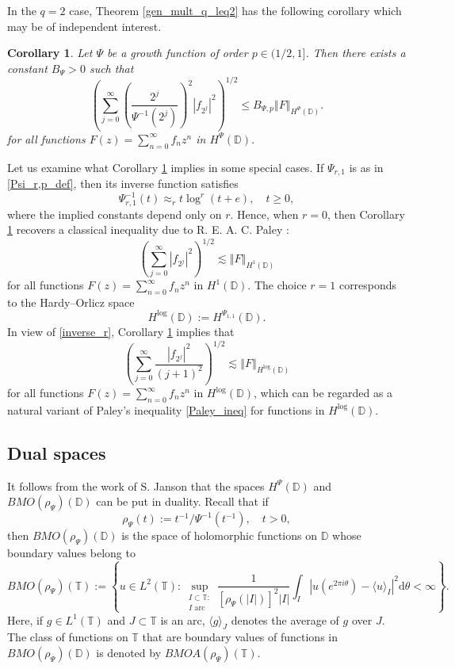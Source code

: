 \documentclass[a4paper, leqno, 10pt]{amsart}
\numberwithin{equation}{section}
\newtheorem{corollary}[thm]{Corollary}
\newcommand{\dd}{\mathrm{d}}
\newcommand{\T}{\mathbb{T}}
\newcommand{\norm}[1]{\left\Vert#1\right\Vert}
\newcommand{\abs}[1]{\left|#1\right|}
\newcommand{\D}{\mathbb{D}}
\begin{document}
In the $q=2$ case, Theorem \ref{gen_mult_q_leq2} has the following corollary which may be of independent interest.

\begin{corollary}\label{cor_Paley_ineq_Psi}
Let $\Psi$  be a growth function of order $p \in (1/2,1]$. 
Then there exists a constant $B_{\Psi} >0$ such that
\[
\left( \sum_{j = 0}^{\infty} \left( \frac {2^j} {\Psi^{-1}(2^j)} \right)^2 |f_{2^j}|^2 \right)^{1/2} \leq B_{\Psi, p} \norm{ F }_{H^{\Psi} (\D)}.
\]
for all functions $F(z)=\sum_{n=0}^{\infty} f_n z^n$ in $H^{\Psi} (\D)$.
\end{corollary}

Let us examine what Corollary \ref{cor_Paley_ineq_Psi} implies in some special cases. If  $\Psi_{r,1} $ is as in \eqref{Psi_r,p_def}, then its inverse function satisfies
\begin{equation}\label{inverse_r}
\Psi^{-1}_{r,1} (t) \approx_r  t \log^r (t+e), \quad t \geq 0,
\end{equation}
where the implied constants depend only on $r$. Hence, when $r=0$, then Corollary \ref{cor_Paley_ineq_Psi} recovers a classical inequality due to R. E. A. C. Paley \cite{P}:
\begin{equation}\label{Paley_ineq}
\left( \sum_{j = 0}^{\infty} |f_{2^j}|^2 \right)^{1/2} \lesssim \norm{ F }_{H^1 (\D)} 
\end{equation}
for all functions $F(z)=\sum_{n=0}^{\infty} f_n z^n$ in $H^1 (\D)$. The choice $r=1$ corresponds to the Hardy--Orlicz space
\[
H^{\log} (\D) := H^{\Psi_{1,1}} (\D) .\]
In view of \eqref{inverse_r}, Corollary \ref{cor_Paley_ineq_Psi} implies that
\begin{equation}\label{Paley_ineq_Hlog}
\left(\sum_{j = 0}^{\infty} \frac{|f_{2^j}|^2}{(j+1)^{2}} \right)^{1/2} \lesssim \norm{ F }_{H^{\log} (\D)}  
\end{equation}
for all functions $F(z)=\sum_{n=0}^{\infty} f_n z^n$ in $H^{\log}(\D)$, which can be regarded as a natural variant of Paley's inequality \eqref{Paley_ineq} for functions in $H^{\log} (\D)$.

\subsection*{Dual spaces}
It follows from the work of S. Janson \cite{J} that the spaces $H^{\Psi} (\D)$ and $BMO(\rho_{\Psi})(\D)$ can be put in duality. Recall that if \[\rho_{\Psi} (t):=t^{-1} /\Psi^{-1} (t^{-1}), \quad t > 0,\] then $BMO(\rho_{\Psi})(\D)$ is the space of holomorphic functions on $\D$ whose boundary values belong to 
%
\[ BMO(\rho_{\Psi})(\T):=  
\left\{ u \in L^2 (\T) : \sup_{\substack{I \subset \T:\\ I \text{ arc }}} \frac{1} { \left[ \rho_{\Psi} (|I|) \right]^2 |I|} \int_I \abs{ u (e^{2\pi i \theta}) - \langle u \rangle_I }^2 \dd \theta < \infty \right\}.
\]
%
Here, if $g \in L^1 (\T) $ and $J \subset \T$ is an arc, $\langle g \rangle_J$ denotes the average of $g$ over $J$. The class of functions on $\T$ that are boundary values of functions in $BMO(\rho_{\Psi})(\D)$ is denoted by $BMOA (\rho_{\Psi})(\T)$. %
\end{document}
